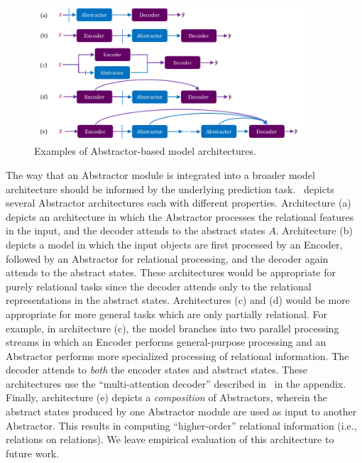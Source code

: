 \begin{figure}
    \centering
    \includegraphics[width=0.9\textwidth]{figures/abstractor_architectures.pdf}
    \caption{Examples of Abstractor-based model architectures.}\label{fig:abstractor_architectures}
\end{figure}


The way that an Abstractor module is integrated into a broader model architecture should be informed by the underlying prediction task.~ depicts several Abstractor architectures each with different properties. Architecture (a) depicts an architecture in which the Abstractor processes the relational features in the input, and the decoder attends to the abstract states $A$. Architecture (b) depicts a model in which the input objects are first processed by an Encoder, followed by an Abstractor for relational processing, and the decoder again attends to the abstract states. These architectures would be appropriate for purely relational tasks since the decoder attends only to the relational representations in the abstract states. Architectures (c) and (d) would be more appropriate for more general tasks which are only partially relational. For example, in architecture (c), the model branches into two parallel processing streams in which an Encoder performs general-purpose processing and an Abstractor performs more specialized processing of relational information.
The decoder attends to \textit{both} the encoder states and abstract states.
These architectures use the ``multi-attention decoder'' described in~ in the appendix.
Finally, architecture (e) depicts a \textit{composition} of Abstractors, wherein the abstract states produced by one Abstractor module are used as input to another Abstractor. This results in computing ``higher-order'' relational information (i.e., relations on relations).
We leave empirical evaluation of this architecture to future work. 